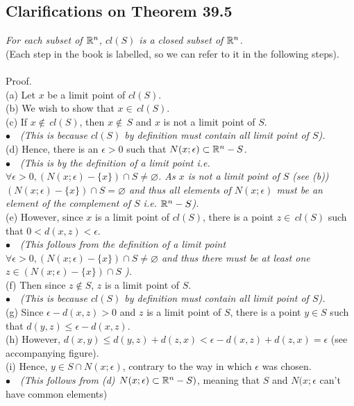 \subsection*{Clarifications on Theorem 39.5}
\textit{For each subset of $\mathbb{R}^n$, $cl (S)$ is a closed subset of $\mathbb{R}^n$.}\\
(Each step in the book is labelled, so we can refer to it in the following steps).\\\\
Proof. \\
(a) Let $x$ be a limit point of $cl (S)$. \\
(b) We wish to show that $x \in \, cl (S)$.\\
(c) If $x \not \in \, cl (S)$, then $x \not \in \, S$ and $x$ is not a limit point of $S$.\\
    \textit{$\bullet\quad$(This is because $cl(S)$ by definition must contain all limit point of $S$).}\\
(d) Hence, there is an $\epsilon  > 0$
such that $N(x; \epsilon)\subset \mathbb{R}^n- S$. \\
\textit{$\bullet\quad$(This is by the definition of a limit point i.e. $\forall\epsilon>0, (N(x; \epsilon)-\{x\})\cap S\neq \varnothing$. As $x$ is not a limit point of $S$ (see (b)) $(N(x; \epsilon)-\{x\})\cap S= \varnothing$ and thus all elements of $N(x; \epsilon)$ must be an element of the complement of $S$ i.e. $\mathbb{R}^n-S$).}\\
(e) However, since $x$ is a limit point of $cl (S)$, there is a
point $z \in \,  cl (S)$ such that $0 < d(x, z) < \epsilon$.\\
\textit{$\bullet\quad$(This follows from the definition of a limit point $\forall\epsilon>0, (N(x; \epsilon)-\{x\})\cap S\neq \varnothing$ and thus there must be at least one $z\in(N(x; \epsilon)-\{x\})\cap S$ ).}\\
(f) Then since $z\not\in S$, $z$ is a limit point of $S$.\\
\textit{$\bullet\quad$(This is because $cl(S)$ by definition must contain all limit point of $S$).}\\
(g) Since $\epsilon - d(x, z) > 0$ and $z$ is a limit point of $S$, there is a point $y\in S$ such that
$d(y, z) \leq  \epsilon - d(x, z)$.\\
(h) However, $d(x, y) \leq d(y, z) + d(z, x) < \epsilon - d(x, z) +d(z, x) = \epsilon$ (see accompanying figure).\\
(i) Hence, $y\in S\cap N(x;\epsilon)$, contrary to the way in which $\epsilon$ was chosen.
\\
\textit{$\bullet\quad$(This follows from (d) $N(x; \epsilon)\subset \mathbb{R}^n- S)$}, meaning that $S$ and $N(x; \epsilon$ can't have common elements)\\
\newpage

